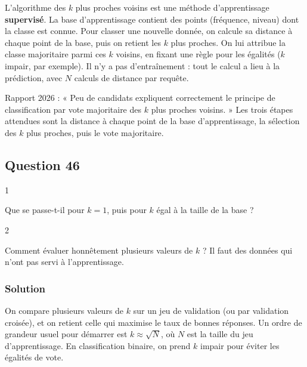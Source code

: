 \documentclass[11pt,a4paper]{article}
\begin{document}
L'algorithme des \(k\) plus proches voisins est une méthode d'apprentissage \textbf{supervisé}. La base d'apprentissage contient des points (fréquence, niveau) dont la classe est connue. Pour classer une nouvelle donnée, on calcule sa distance à chaque point de la base, puis on retient les \(k\) plus proches. On lui attribue la classe majoritaire parmi ces \(k\) voisins, en fixant une règle pour les égalités (\(k\) impair, par exemple). Il n'y a pas d'entraînement : tout le calcul a lieu à la prédiction, avec \(N\) calculs de distance par requête.

\begin{jury}

Rapport 2026 : « Peu de candidats expliquent correctement le principe de classification par vote majoritaire des \(k\) plus proches voisins. » Les trois étapes attendues sont la distance à chaque point de la base d'apprentissage, la sélection des \(k\) plus proches, puis le vote majoritaire.

\end{jury}

\hypertarget{question-46}{%
\subsection{Question 46}\label{question-46}}

\begin{indication}{1}

Que se passe-t-il pour \(k = 1\), puis pour \(k\) égal à la taille de la base ?

\end{indication}

\begin{indication}{2}

Comment évaluer honnêtement plusieurs valeurs de \(k\) ? Il faut des données qui n'ont pas servi à l'apprentissage.

\end{indication}

\hypertarget{solution-45}{%
\subsubsection{Solution}\label{solution-45}}

On compare plusieurs valeurs de \(k\) sur un jeu de validation (ou par validation croisée), et on retient celle qui maximise le taux de bonnes réponses. Un ordre de grandeur usuel pour démarrer est \(k \approx \sqrt N\), où \(N\) est la taille du jeu d'apprentissage. En classification binaire, on prend \(k\) impair pour éviter les égalités de vote.
\end{document}
